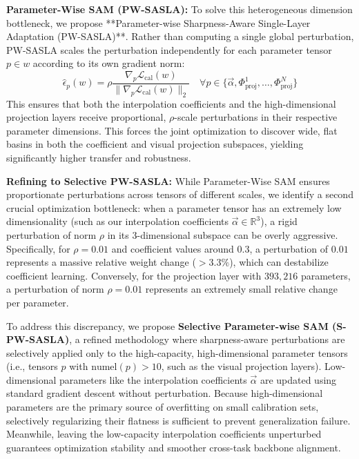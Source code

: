 \documentclass{article}
\theoremstyle{plain}
\theoremstyle{definition}
\theoremstyle{remark}
\begin{document}
\textbf{Parameter-Wise SAM (PW-SASLA):}
To solve this heterogeneous dimension bottleneck, we propose **Parameter-wise Sharpness-Aware Single-Layer Adaptation (PW-SASLA)**. Rather than computing a single global perturbation, PW-SASLA scales the perturbation independently for each parameter tensor $p \in w$ according to its own gradient norm:
\begin{equation}
    \hat{\epsilon}_p(w) = \rho \frac{\nabla_p \mathcal{L}_{\text{cal}}(w)}{\|\nabla_p \mathcal{L}_{\text{cal}}(w)\|_2} \quad \forall p \in \{\vec{\alpha}, \Phi_{\text{proj}}^1, \dots, \Phi_{\text{proj}}^N\}
\end{equation}
This ensures that both the interpolation coefficients and the high-dimensional projection layers receive proportional, $\rho$-scale perturbations in their respective parameter dimensions. This forces the joint optimization to discover wide, flat basins in both the coefficient and visual projection subspaces, yielding significantly higher transfer and robustness.

\textbf{Refining to Selective PW-SASLA:}
While Parameter-Wise SAM ensures proportionate perturbations across tensors of different scales, we identify a second crucial optimization bottleneck: when a parameter tensor has an extremely low dimensionality (such as our interpolation coefficients $\vec{\alpha} \in \mathbb{R}^3$), a rigid perturbation of norm $\rho$ in its 3-dimensional subspace can be overly aggressive. Specifically, for $\rho = 0.01$ and coefficient values around $0.3$, a perturbation of $0.01$ represents a massive relative weight change ($>3.3\%$), which can destabilize coefficient learning. Conversely, for the projection layer with $393,216$ parameters, a perturbation of norm $\rho = 0.01$ represents an extremely small relative change per parameter.

To address this discrepancy, we propose \textbf{Selective Parameter-wise SAM (S-PW-SASLA)}, a refined methodology where sharpness-aware perturbations are selectively applied only to the high-capacity, high-dimensional parameter tensors (i.e., tensors $p$ with $\text{numel}(p) > 10$, such as the visual projection layers). Low-dimensional parameters like the interpolation coefficients $\vec{\alpha}$ are updated using standard gradient descent without perturbation. Because high-dimensional parameters are the primary source of overfitting on small calibration sets, selectively regularizing their flatness is sufficient to prevent generalization failure. Meanwhile, leaving the low-capacity interpolation coefficients unperturbed guarantees optimization stability and smoother cross-task backbone alignment.
\end{document}
